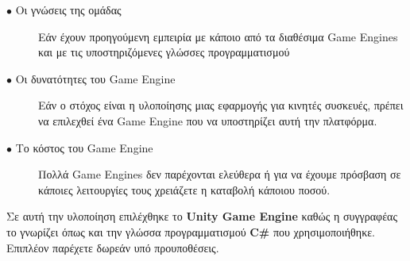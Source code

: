 \begin{description}
\item[$\bullet$ Οι γνώσεις της ομάδας] Εάν έχουν προηγούμενη εμπειρία με κάποιο από τα διαθέσιμα Game Engines και με τις υποστηριζόμενες γλώσσες προγραμματισμού
\item[$\bullet$ Οι δυνατότητες του Game Engine] Εάν ο στόχος είναι η υλοποίησης μιας εφαρμογής για κινητές συσκευές, πρέπει να επιλεχθεί ένα Game Engine που να υποστηρίζει αυτή την πλατφόρμα.
\item[$\bullet$ Το κόστος του Game Engine] Πολλά Game Engines δεν παρέχονται ελεύθερα ή για να έχουμε πρόσβαση σε κάποιες λειτουργίες τους χρειάζετε η καταβολή κάποιου ποσού.
\end{description}

\par
Σε αυτή την υλοποίηση επιλέχθηκε το \textbf{Unity Game Engine} καθώς η συγγραφέας το γνωρίζει όπως και την γλώσσα προγραμματισμού \textbf{C\#} που χρησιμοποιήθηκε. Επιπλέον παρέχετε δωρεάν υπό προυποθέσεις.